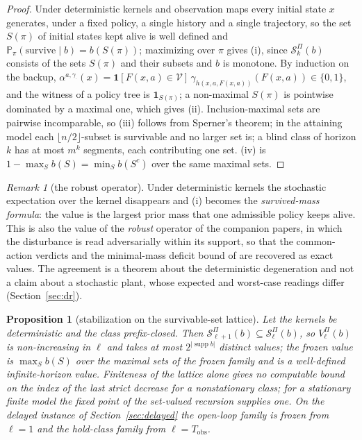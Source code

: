 \documentclass[11pt,a4paper]{article}
\theoremstyle{plain}
\newtheorem{proposition}[theorem]{Proposition}
\theoremstyle{definition}
\theoremstyle{remark}
\newtheorem{remark}[theorem]{Remark}
\newcommand{\Prob}{\mathbb{P}}
\newcommand{\calV}{\mathcal{V}}
\newcommand{\calS}{\mathcal{S}}
\newcommand{\supp}{\operatorname{supp}}
\newcommand{\Tobs}{T_{\mathrm{obs}}}
\newcommand{\ind}[1]{\mathbf{1}[#1]}
\begin{document}
\begin{proof}
Under deterministic kernels and observation maps every initial state $x$ generates, under a fixed policy, a single history and a single trajectory, so the set $S(\pi)$ of initial states kept alive is well defined and $\Prob_\pi(\text{survive}\mid b)=b(S(\pi))$; maximizing over $\pi$ gives (i), since $\calS^{\Pi}_k(b)$ consists of the sets $S(\pi)$ and their subsets and $b$ is monotone. By induction on the backup, $\alpha^{a,\gamma_\cdot}(x)=\ind{F(x,a)\in\calV}\,\gamma_{h(x,a,F(x,a))}(F(x,a))\in\{0,1\}$, and the witness of a policy tree is $\mathbf 1_{S(\pi)}$; a non-maximal $S(\pi)$ is pointwise dominated by a maximal one, which gives (ii). Inclusion-maximal sets are pairwise incomparable, so (iii) follows from Sperner's theorem; in the attaining model each $\lfloor n/2\rfloor$-subset is survivable and no larger set is; a blind class of horizon $k$ has at most $m^{k}$ segments, each contributing one set. (iv) is $1-\max_S b(S)=\min_S b(S^{c})$ over the same maximal sets.
\end{proof}

\begin{remark}[the robust operator]\label{rem:operators}
Under deterministic kernels the stochastic expectation over the kernel disappears and (i) becomes the \emph{survived-mass formula}: the value is the largest prior mass that one admissible policy keeps alive. This is also the value of the \emph{robust} operator of the companion papers, in which the disturbance is read adversarially within its support, so that the common-action verdicts and the minimal-mass deficit bound of \cite{Abaee2026calc} are recovered as exact values. The agreement is a theorem about the deterministic degeneration and not a claim about a stochastic plant, whose expected and worst-case readings differ (Section~\ref{sec:dr}).
\end{remark}

\begin{proposition}[stabilization on the survivable-set lattice]\label{prop:freeze}
Let the kernels be deterministic and the class prefix-closed. Then $\calS^{\Pi}_{\ell+1}(b)\subseteq\calS^{\Pi}_{\ell}(b)$, so $V^{\Pi}_\ell(b)$ is non-increasing in $\ell$ and takes at most $2^{|\supp b|}$ distinct values; the frozen value is $\max_S b(S)$ over the maximal sets of the frozen family and is a well-defined infinite-horizon value. Finiteness of the lattice alone gives no computable bound on the index of the last strict decrease for a nonstationary class; for a stationary finite model the fixed point of the set-valued recursion supplies one. On the delayed instance of Section~\ref{sec:delayed} the open-loop family is frozen from $\ell=1$ and the hold-class family from $\ell=\Tobs$.
\end{proposition}
\end{document}
